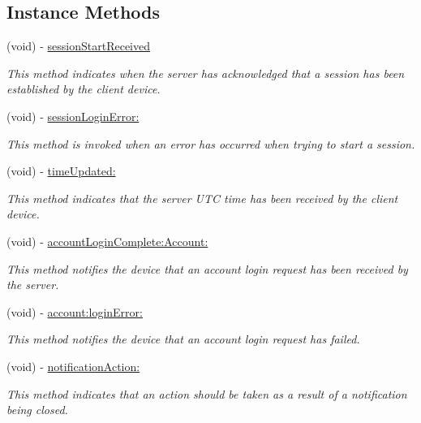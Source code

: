 \subsection*{Instance Methods}
\begin{DoxyCompactItemize}
\item 
(void) -\/ \hyperlink{protocol_fuse_delegate-p_a4278f68e73dc20a7a24b331959a1872c}{session\+Start\+Received}
\begin{DoxyCompactList}\small\item\em This method indicates when the server has acknowledged that a session has been established by the client device. \end{DoxyCompactList}\item 
(void) -\/ \hyperlink{protocol_fuse_delegate-p_a24b19ff8cc73955c5cc3b84428b302b0}{session\+Login\+Error\+:}
\begin{DoxyCompactList}\small\item\em This method is invoked when an error has occurred when trying to start a session. \end{DoxyCompactList}\item 
(void) -\/ \hyperlink{protocol_fuse_delegate-p_a85c5468cf940315584698956edcbbdfd}{time\+Updated\+:}
\begin{DoxyCompactList}\small\item\em This method indicates that the server U\+T\+C time has been received by the client device. \end{DoxyCompactList}\item 
(void) -\/ \hyperlink{protocol_fuse_delegate-p_a54a18530604a7ceeb0e9419fc7fa3345}{account\+Login\+Complete\+:\+Account\+:}
\begin{DoxyCompactList}\small\item\em This method notifies the device that an account login request has been received by the server. \end{DoxyCompactList}\item 
(void) -\/ \hyperlink{protocol_fuse_delegate-p_a1c8b10d8ec200c9d2aed94c494109a86}{account\+:login\+Error\+:}
\begin{DoxyCompactList}\small\item\em This method notifies the device that an account login request has failed. \end{DoxyCompactList}\item 
(void) -\/ \hyperlink{protocol_fuse_delegate-p_afc6afbdf6a149756eb2dca5e0fd64b77}{notification\+Action\+:}
\begin{DoxyCompactList}\small\item\em This method indicates that an action should be taken as a result of a notification being closed. \end{DoxyCompactList}\item 

\end{DoxyCompactItemize}
